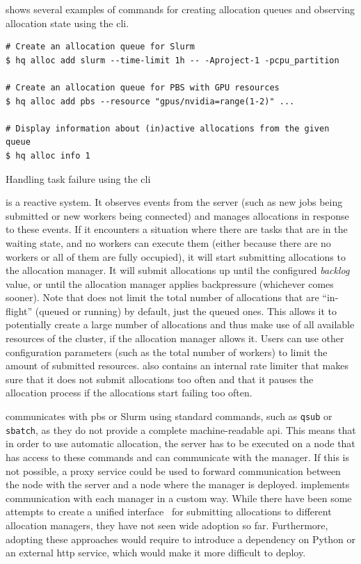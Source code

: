  shows several examples of commands for creating allocation queues and
observing allocation state using the \hyperqueue{} \gls{cli}.

\begin{listing}[h]
	\begin{verbatim}
# Create an allocation queue for Slurm
$ hq alloc add slurm --time-limit 1h -- -Aproject-1 -pcpu_partition

# Create an allocation queue for PBS with GPU resources
$ hq alloc add pbs --resource "gpus/nvidia=range(1-2)" ...

# Display information about (in)active allocations from the given queue
$ hq alloc info 1
	\end{verbatim}
	\caption{Handling task failure using the \hyperqueue{} \gls{cli}}
	\label{lst:hq-cli-autoalloc}
\end{listing}

\Autoalloc{} is a reactive system. It observes events from the server (such as new jobs
being submitted or new workers being connected) and manages allocations in response to these
events. If it encounters a situation where there are tasks that are in the waiting state, and no
workers can execute them (either because there are no workers or all of them are fully occupied),
it will start submitting allocations to the allocation manager. It will submit allocations up until
the configured \emph{backlog} value, or until the allocation manager applies backpressure
(whichever comes sooner). Note that \autoalloc{} does not limit the total number of
allocations that are ``in-flight'' (queued or running) by default, just the queued ones. This
allows it to potentially create a large number of allocations and thus make use of all available
resources of the cluster, if the allocation manager allows it. Users can use other configuration
parameters (such as the total number of workers) to limit the amount of submitted resources.
\Autoalloc{} also contains an internal rate limiter that makes sure that it does not
submit allocations too often and that it pauses the allocation process if the allocations start
failing too often.

\hyperqueue{} communicates with \gls{pbs} or Slurm using standard
commands, such as \texttt{qsub} or \texttt{sbatch}, as they do not provide a
complete machine-readable \gls{api}. This means that in order to use automatic
allocation, the server has to be executed on a node that has access to these commands and can
communicate with the manager. If this is not possible, a proxy service could be used to forward
communication between the node with the server and a node where the manager is deployed.
\hyperqueue{} implements communication with each manager in a custom way. While there
have been some attempts to create a unified interface~\cite{psij,workflow-alloc-manager-comm} for submitting
allocations to different allocation managers, they have not seen wide adoption so far. Furthermore,
adopting these approaches would require \hq{} to introduce a dependency on Python
or an external \gls{http} service, which would make it more difficult to deploy.


